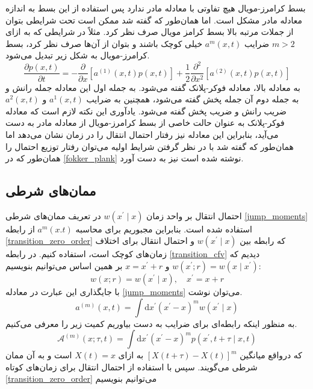 بسط کرامرز-مویال هیچ تفاوتی با معادله مادر ندارد پس استفاده از این بسط به اندازه معادله مادر مشکل است. اما همان‌طور که گفته شد ممکن است تحت شرایطی بتوان از جملات مرتبه بالا بسط کرامز مویال صرف نظر کرد. مثلاً در شرایطی که به ازای $m > 2$ ضرایب $a^{m}(x,t)$ خیلی کوچک باشند و بتوان از آن‌ها صرف نظر کرد، بسط کرامرز-مویال به شکل زیر تبدیل می‌شود.
\begin{equation}
  \frac{\partial p(x, t)}{\partial t}=-\frac{\partial}{\partial x}\left[a^{(1)}(x, t) p(x, t)\right]+\frac{1}{2} \frac{\partial^{2}}{\partial x^{2}}\left[a^{(2)}(x, t) p(x, t)\right]
  \label{fokker_plank}
\end{equation}
به معادله بالا، معادله فوکر-پلانک گفته می‌شود. به جمله اول این معادله جمله رانش و به جمله دوم آن جمله پخش گفته می‌شود، همچنین به ضرایب $a^{1}(x,t)$ و $a^{2}(x,t)$ ضریب رانش و ضریب پخش گفته می‌شود. یادآوری این نکته لازم است که معادله فوکر-پلانک به عنوان حالت خاصی از بسط کرامرز-مویال از معادله مادر به دست می‌آید، بنابراین این معادله نیز رفتار احتمال انتقال را در زمان نشان می‌دهد اما همان‌طور که گفته شد با در نظر گرفتن شرایط اولیه می‌توان رفتار توزیع احتمال را همان‌طور که در \ref{fokker_plank} نوشته شده است نیز به دست آورد.\cite{moyal_stochastic_1949}

\subsection{ممان‌های شرطی}

احتمال انتقال بر واحد زمان $w(x^\prime \mid x)$ در تعریف ممان‌های شرطی \ref{jump_moments} استفاده شده است. بنابراین مجبوریم برای محاسبه $a^{m}(x.t)$ از رابطه \ref{transition_zero_order} که رابطه بین $w(x^\prime \mid x)$ و احتمال انتقال برای اختلاف زمان‌های کوچک است، استفاده کنیم.
در رابطه \ref{transition_cfv} دیدیم که $w(x^\prime ; r) = w(x \mid x^\prime)$ و $x = x^\prime + r$ بر همین اساس می‌توانیم بنویسیم:
$$
w(x ; r)=w\left(x^{\prime} \mid x\right), \quad x^{\prime}=x+r
$$
با جایگذاری این عبارت در معادله \ref{jump_moments} می‌توان نوشت.
\begin{equation}
  a^{(m)}(x, t)=\int \mathrm{d} x^{\prime}\left(x^{\prime}-x\right)^{m} w\left(x^{\prime} \mid x\right)
\end{equation}
به منظور اینکه رابطه‌ای برای ضرایب به دست بیاوریم کمیت زیر را معرفی می‌کنیم.
\begin{equation}
  \mathcal{A}^{(m)}(x ; \tau, t)=\int \mathrm{d} x^{\prime}\left(x^{\prime}-x\right)^{m} p\left(x^{\prime}, t+\tau \mid x, t\right)
\end{equation}
که در‌واقع میانگین $[X(t + \tau) - X(t)]^{m}$ به ازای $X(t) = x$ است و به آن ممان شرطی می‌گویند. سپس با استفاده از احتمال انتقال برای زمان‌های کوتاه \ref{transition_zero_order} می‌توانیم بنویسیم

